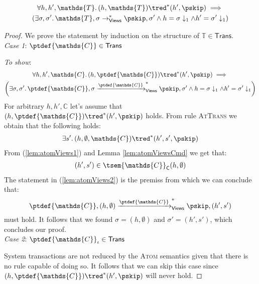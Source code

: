 \begin{lem}
	\begin{gather*}
		\forall h, h', \mathds{T} \ldotp
		(h, \mathds{T}) \tred^* (h', \pskip)
		\implies \\
		\left(		
			\exists \sigma, \sigma' \ldotp
			\mathds{T}, \sigma \rightarrow^*_{\mathsf{Views}} \pskip, \sigma'
			\land h = \sigma \downarrow_1 \land h' = \sigma' \downarrow_1
		\right)
	\end{gather*}
	{\parindent0pt
	\begin{proof}
	We prove the statement by induction on the structure of $\mathds{T} \in \mathsf{Trans}$. \\
	
	\textit{Case 1}: $\ptdef{\mathds{C}} \in \mathsf{Trans}$
	
	\textit{To show}:
	\begin{gather*}
		\forall h, h', \mathds{C} \ldotp
		(h, \ptdef{\mathds{C}}) \tred^* (h', \pskip)
		\implies \\
		\left(		
			\exists \sigma, \sigma' \ldotp
			\ptdef{\mathds{C}}, \sigma \xrightarrow{\ptdef{\mathds{C}}}^*_{\mathsf{Views}} \pskip, \sigma'
			\land h = \sigma \downarrow_1 \land h' = \sigma' \downarrow_1
		\right)
	\end{gather*}
	For arbitrary $h, h', \mathds{C}$ let's assume that $(h, \ptdef{\mathds{C}}) \tred^* (h', \pskip)$ holds. From rule \textsc{AtTrans} we obtain that the following holds:
	\begin{gather}
		\label{lem:atomViews1}
		\exists s' \ldotp
		(h, \emptyset, \mathds{C}) \tred^* (h', s', \pskip)
	\end{gather}
	From (\ref{lem:atomViews1}) and Lemma \ref{lem:atomViewsCmd} we get that:
	\begin{gather}
		\label{lem:atomViews2}
		(h', s') \in \tsem{\mathds{C}}_\mathsf{C}(h, \emptyset)
	\end{gather}
	The statement in (\ref{lem:atomViews2}) is the premiss from which we can conclude that:
	\[
		\ptdef{\mathds{C}}, (h, \emptyset) \xrightarrow{\ptdef{\mathds{C}}}^*_{\mathsf{Views}} \pskip, (h', s')
	\]
	must hold. It follows that we found $\sigma = (h, \emptyset)$ and $\sigma' = (h', s')$, which concludes our proof.
	\\	
	
	\textit{Case 2}: $\ptdef{\mathds{C}}_\iota \in \mathsf{Trans}$
	
	System transactions are not reduced by the \textsc{Atom} semantics given that there is no rule capable of doing so. It follows that we can skip this case since $(h, \ptdef{\mathds{C}}) \tred^* (h', \pskip)$ will never hold.
	\end{proof}
	}
\end{lem}

